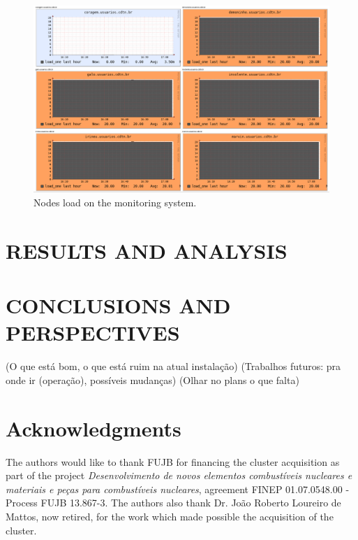 \documentclass[twoside,a4paper,12pt,english]{inac19}
\begin{document}
\begin{figure}[h] %
  \centering\includegraphics[scale=0.5]{images/ganglia_nodes.png}
  \caption{Nodes load on the monitoring system.}
  \label{fig:ganglia-nodes}
\end{figure}


\section{RESULTS AND ANALYSIS}


\section{CONCLUSIONS AND PERSPECTIVES}

(O que está bom, o que está ruim na atual instalação)
(Trabalhos futuros: pra onde ir (operação), possíveis mudanças)
(Olhar no plans o que falta)






\section*{Acknowledgments}
The authors would like to thank FUJB for financing the cluster acquisition
as part of the project \textit{Desenvolvimento de novos elementos combust\'{i}veis nucleares
  e materiais e pe\c{c}as para combust\'{i}veis nucleares}, agreement FINEP 01.07.0548.00 - Process FUJB 13.867-3.
The authors also thank Dr. Jo\~{a}o Roberto Loureiro de Mattos, now retired, for the work which made possible the acquisition of the cluster.
\end{document}
